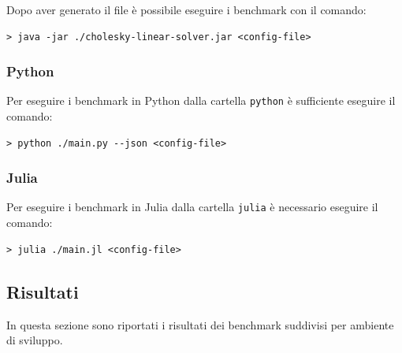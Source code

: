 \documentclass[a4paper, 12pt]{article}
\begin{document}
Dopo aver generato il file è possibile eseguire i benchmark con il comando:
\begin{lstlisting}[frame=single]
> java -jar ./cholesky-linear-solver.jar <config-file>
\end{lstlisting} 

\subsubsection{Python}
Per eseguire i benchmark in Python dalla cartella \texttt{python} è sufficiente
eseguire il comando:
\begin{lstlisting}[frame=single]
> python ./main.py --json <config-file>
\end{lstlisting}

\subsubsection{Julia}
Per eseguire i benchmark in Julia dalla cartella \texttt{julia} è necessario
eseguire il comando:
\begin{lstlisting}[frame=single]
> julia ./main.jl <config-file>
\end{lstlisting}

\subsection{Risultati}
In questa sezione sono riportati i risultati dei benchmark suddivisi per
ambiente di sviluppo.
\end{document}
